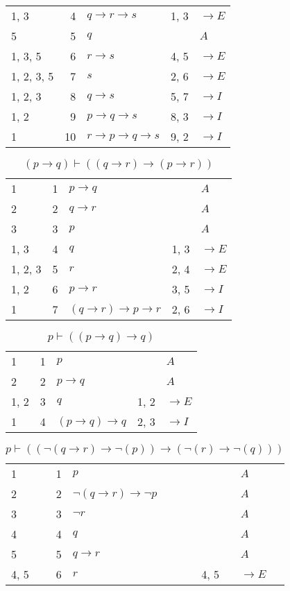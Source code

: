 \documentclass{article}
\begin{document}
\begin{table}[htbp]
\begin{tabular}{lrlll}
{1, 3} & 4 & $q→r→s$ & {1, 3} & $→E$ \\
{5} & 5 & $q$ & {} & $A$ \\
{1, 3, 5} & 6 & $r→s$ & {4, 5} & $→E$ \\
{1, 2, 3, 5} & 7 & $s$ & {2, 6} & $→E$ \\
{1, 2, 3} & 8 & $q→s$ & {5, 7} & $→I$ \\
{1, 2} & 9 & $p→q→s$ & {8, 3} & $→I$ \\
{1} & 10 & $r→p→q→s$ & {9, 2} & $→I$ \\
\end{tabular}
\end{table}\begin{table}[htbp]\caption*{$(p → q) ⊢ ((q → r) → (p → r))$}\centering\begin{tabular}{lrlll}
{1} & 1 & $p→q$ & {} & $A$ \\
{2} & 2 & $q→r$ & {} & $A$ \\
{3} & 3 & $p$ & {} & $A$ \\
{1, 3} & 4 & $q$ & {1, 3} & $→E$ \\
{1, 2, 3} & 5 & $r$ & {2, 4} & $→E$ \\
{1, 2} & 6 & $p→r$ & {3, 5} & $→I$ \\
{1} & 7 & $(q→r)→p→r$ & {2, 6} & $→I$ \\
\end{tabular}
\end{table}\begin{table}[htbp]\caption*{$p ⊢ ((p → q) → q)$}\centering\begin{tabular}{lrlll}
{1} & 1 & $p$ & {} & $A$ \\
{2} & 2 & $p→q$ & {} & $A$ \\
{1, 2} & 3 & $q$ & {1, 2} & $→E$ \\
{1} & 4 & $(p→q)→q$ & {2, 3} & $→I$ \\
\end{tabular}
\end{table}\begin{table}[htbp]\caption*{$p ⊢ ((¬(q→r)→ ¬(p))→ (¬(r)→ ¬(q)))$}\centering\begin{tabular}{lrlll}
{1} & 1 & $p$ & {} & $A$ \\
{2} & 2 & $¬ (q→r)→ ¬p$ & {} & $A$ \\
{3} & 3 & $¬r$ & {} & $A$ \\
{4} & 4 & $q$ & {} & $A$ \\
{5} & 5 & $q→r$ & {} & $A$ \\
{4, 5} & 6 & $r$ & {4, 5} & $→E$ \\

\end{tabular}
\end{table}
\end{document}
